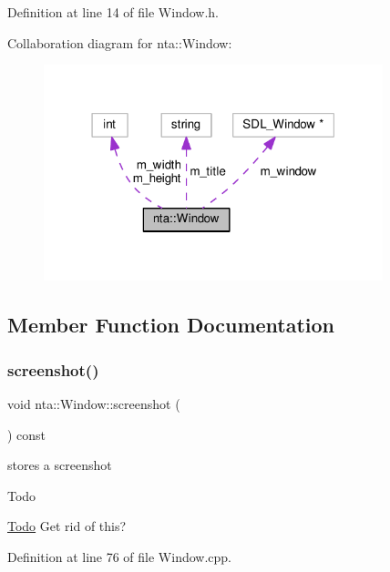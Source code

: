 Definition at line 14 of file Window.\+h.



Collaboration diagram for nta\+:\+:Window\+:
\nopagebreak
\begin{figure}[H]
\begin{center}
\leavevmode
\includegraphics[width=279pt]{da/daa/classnta_1_1Window__coll__graph}
\end{center}
\end{figure}


\subsection{Member Function Documentation}
\mbox{\label{classnta_1_1Window_aa144f6bb014aaad3c91c3f3e6ad56f9c}} 
\subsubsection{\texorpdfstring{screenshot()}{screenshot()}}
{\footnotesize\ttfamily void nta\+::\+Window\+::screenshot (\begin{DoxyParamCaption}{ }\end{DoxyParamCaption}) const}



stores a screenshot 

\begin{DoxyRefDesc}{Todo}
\item[\hyperlink{todo__todo000013}{Todo}]Get rid of this? \end{DoxyRefDesc}


Definition at line 76 of file Window.\+cpp.

